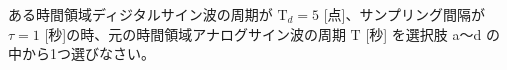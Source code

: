 ある時間領域ディジタルサイン波の周期が $\textrm{T}_d = 5$ [点]、サンプリング間隔が $\tau = 1$ [秒]の時、元の時間領域アナログサイン波の周期 $\textrm{T}$ [秒] を選択肢 a〜d の中から1つ選びなさい。
